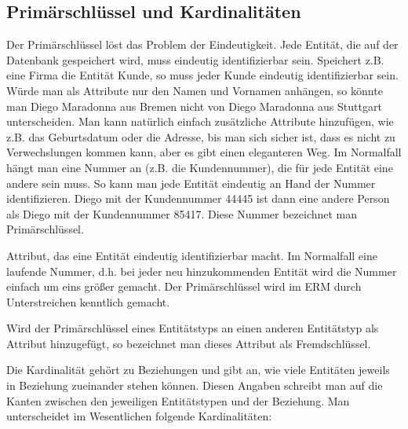 \subsection{Primärschlüssel und Kardinalitäten}
Der Primärschlüssel löst das Problem der Eindeutigkeit. Jede Entität, die auf der Datenbank gespeichert wird, muss eindeutig identifizierbar sein. Speichert z.B. eine Firma die Entität Kunde, so muss jeder Kunde eindeutig identifizierbar sein. Würde man als Attribute nur den Namen und Vornamen anhängen, so könnte man Diego Maradonna aus Bremen nicht von Diego Maradonna aus Stuttgart unterscheiden. Man kann natürlich einfach zusätzliche Attribute hinzufügen, wie z.B. das Geburtsdatum oder die Adresse, bis man sich sicher ist, dass es nicht zu Verwechslungen kommen kann, aber es gibt einen eleganteren Weg. Im Normalfall hängt man eine Nummer an (z.B. die Kundennummer), die für jede Entität eine andere sein muss. So kann man jede Entität eindeutig an Hand der Nummer identifizieren. Diego mit der Kundennummer 44445 ist dann eine andere Person als Diego mit der Kundennummer 85417. Diese Nummer bezeichnet man Primärschlüssel.
\begin{tcolorbox}[title=Primärschlüssel]
	Attribut, das eine Entität eindeutig identifizierbar macht. Im Normalfall eine laufende Nummer, d.h. bei jeder neu hinzukommenden Entität wird die Nummer einfach um eins größer gemacht. Der Primärschlüssel wird im ERM durch Unterstreichen kenntlich gemacht.
\end{tcolorbox}
\begin{tcolorbox}[title=Fremdschlüssel]
	Wird der Primärschlüssel eines Entitätstyps an einen anderen Entitätstyp als Attribut hinzugefügt, so bezeichnet man dieses Attribut als Fremdschlüssel.
\end{tcolorbox}
Die Kardinalität gehört zu Beziehungen und gibt an, wie viele Entitäten jeweils in Beziehung zueinander stehen können. Diesen Angaben schreibt man auf die Kanten zwischen den jeweiligen Entitätstypen und der Beziehung. Man unterscheidet im Wesentlichen folgende Kardinalitäten:\\
